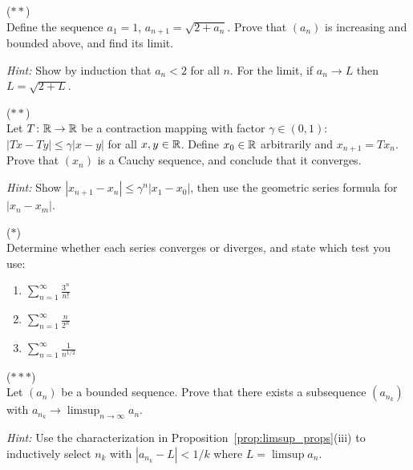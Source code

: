 \documentclass[11pt,a4paper]{article}
\begin{document}
\begin{exercise}
\textnormal{(\(**\))} \\
Define the sequence $a_1 = 1$, $a_{n+1} = \sqrt{2 + a_n}$. Prove that
$(a_n)$ is increasing and bounded above, and find its limit.

\textit{Hint:} Show by induction that $a_n < 2$ for all $n$. For the
limit, if $a_n \to L$ then $L = \sqrt{2 + L}$.
\end{exercise}

\begin{exercise}
\textnormal{(\(**\))} \\
Let $T\colon \mathbb{R} \to \mathbb{R}$ be a contraction mapping with factor
$\gamma \in (0,1)$: $|Tx - Ty| \le \gamma|x - y|$ for all $x,y \in \mathbb{R}$.
Define $x_0 \in \mathbb{R}$ arbitrarily and $x_{n+1} = Tx_n$. Prove that
$(x_n)$ is a Cauchy sequence, and conclude that it converges.

\textit{Hint:} Show $|x_{n+1} - x_n| \le \gamma^n |x_1 - x_0|$, then
use the geometric series formula for $|x_n - x_m|$.
\end{exercise}

\begin{exercise}
\textnormal{(\(*\))} \\
Determine whether each series converges or diverges, and state which test
you use:
\begin{enumerate}[nosep,label=(\alph*)]
  \item $\displaystyle \sum_{n=1}^\infty \frac{3^n}{n!}$
  \item $\displaystyle \sum_{n=1}^\infty \frac{n}{2^n}$
  \item $\displaystyle \sum_{n=1}^\infty \frac{1}{n^{1/2}}$
\end{enumerate}
\end{exercise}

\begin{exercise}
\textnormal{(\(***\))} \\
Let $(a_n)$ be a bounded sequence. Prove that there exists a subsequence
$(a_{n_k})$ with $a_{n_k} \to \limsup_{n\to\infty} a_n$.

\textit{Hint:} Use the characterization in
Proposition~\ref{prop:limsup_props}(iii) to inductively select $n_k$
with $|a_{n_k} - L| < 1/k$ where $L = \limsup a_n$.
\end{exercise}

\end{document}
